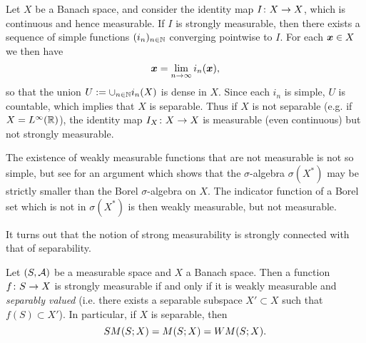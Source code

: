 \begin{example}
  Let $X$ be a Banach space, and consider the identity map $I \colon X \rightarrow X$, which is continuous and hence measurable.
  If $I$ is strongly measurable, then there exists a sequence of simple functions $(i_n)_{n \in \mathbb{N}}$ converging pointwise to $I$.
  For each $\bm{x} \in X$ we then have
  \begin{equation*}
    \bm{x} = \lim_{n \to \infty} i_n(\bm{x}),
  \end{equation*}
  so that the union $U := \cup_{n \in \mathbb{N}} i_n(X)$ is dense in $X$.
  Since each $i_n$ is simple, $U$ is countable, which implies that $X$ is separable.
  Thus if $X$ is not separable (e.g. if $X = L^\infty(\mathbb{R})$), the identity map $I_X \colon X \rightarrow X$ is measurable (even continuous) but not strongly measurable.
\end{example}

\begin{rmk}
  The existence of weakly measurable functions that are not measurable is not so simple, but see \cite[Example 1.4.3]{HNVW16} for an argument which shows that the $\sigma$-algebra $\sigma(X^*)$ may be strictly smaller than the Borel $\sigma$-algebra on $X$.
  The indicator function of a Borel set which is not in $\sigma(X^*)$ is then weakly measurable, but not measurable.
\end{rmk}

It turns out that the notion of strong measurability is strongly connected with that of separability.

\begin{thm}\label{thm:Pettis-measurability}
  Let $(S,\mathcal{A})$ be a measurable space and $X$ a Banach space.
  Then a function $f \colon S \rightarrow X$ is strongly measurable if and only if it is weakly measurable and \emph{separably valued} (i.e. there exists a separable subspace $X' \subset X$ such that $f(S) \subset X'$).
  In particular, if $X$ is separable, then
  \begin{equation*}
    SM(S;X) = M(S;X) = WM(S;X).
  \end{equation*}
\end{thm}

